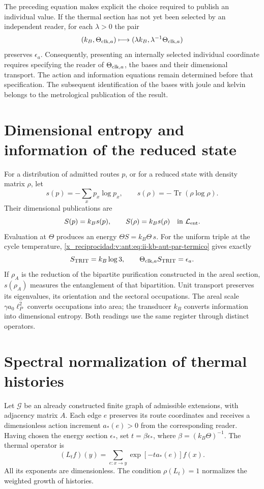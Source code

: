 The preceding equation makes explicit the choice required to publish an
individual value. If the thermal section has not yet been selected
by an independent reader, for each \(\lambda>0\) the pair
\[
 (k_B,\Theta_{{\rm clk},a})
 \longmapsto(\lambda k_B,\lambda^{-1}\Theta_{{\rm clk},a})
\]
preserves \(\epsilon_a\). Consequently, presenting an
internally selected individual coordinate requires specifying the reader of
\(\Theta_{{\rm clk},a}\), the bases and their dimensional transport.
The action and information equations remain determined before
that specification. The subsequent identification of the bases with
joule and kelvin belongs to the metrological publication of the result.

\section{Dimensional entropy and information of the reduced state}

For a distribution of admitted routes \(p\), or for a reduced
state with density matrix \(\rho\), let
\[
 s(p)=-\sum_xp_x\log p_x,\qquad
 s(\rho)=-\operatorname{Tr}(\rho\log\rho).
\]
Their dimensional publications are
\begin{equation}
 S(p)=k_Bs(p),\qquad S(\rho)=k_Bs(\rho)
 \quad\text{in }\mathcal L_{\rm ent}.
 \label{x_reciprocidad:v:ant:eq:ii-kb-aut-entropia}
\end{equation}
Evaluation at \(\Theta\) produces an energy
\(\Theta S=k_B\Theta\,s\). For the uniform triple at the cycle
temperature, \eqref{x_reciprocidad:v:ant:eq:ii-kb-aut-par-termico} gives exactly
\[
 S_{\rm TRIT}=k_B\log3,\qquad
 \Theta_{{\rm clk},a}S_{\rm TRIT}=\epsilon_a.
\]
If \(\rho_A\) is the reduction of the bipartite purification
constructed in the areal section, \(s(\rho_A)\) measures the entanglement
of that bipartition. Unit transport preserves its
eigenvalues, its orientation and the sectoral occupations. The areal
scale \(\gamma a_0\ell_P^2\) converts occupations into area; the
transducer \(k_B\) converts information into dimensional entropy.
Both readings use the same register through distinct operators.

\section{Spectral normalization of thermal histories}

Let \(\mathcal G\) be an already constructed finite graph of admissible
extensions, with adjacency matrix \(A\). Each edge \(e\) preserves
its route coordinates and receives a dimensionless action increment
\(a_*(e)>0\) from the corresponding reader. Having chosen the energy section
\(\epsilon_*\), set \(t=\beta\epsilon_*\), where
\(\beta=(k_B\Theta)^{-1}\). The thermal operator is
\begin{equation}
 (L_tf)(y)=\sum_{e:x\to y}\exp[-t a_*(e)]f(x).
 \label{x_reciprocidad:v:ant:eq:ii-kb-aut-operador}
\end{equation}
All its exponents are dimensionless. The condition
\(\rho(L_t)=1\) normalizes the weighted growth of histories.


